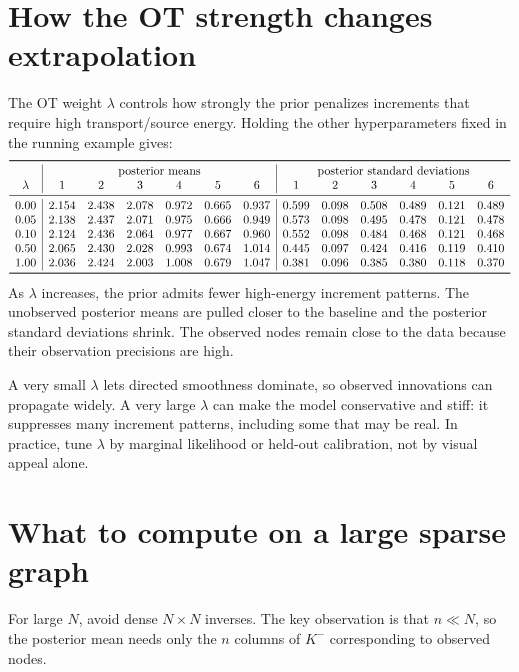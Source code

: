 \documentclass[11pt]{article}
\numberwithin{equation}{section}
\begin{document}
\section{How the OT strength changes extrapolation}
\label{sec:lambda-effects}

The OT weight $\lambda$ controls how strongly the prior penalizes increments that require high transport/source energy.  Holding the other hyperparameters fixed in the running example gives:
\[
\begin{array}{c|cccccc|cccccc}
\toprule
&\multicolumn{6}{c|}{\text{posterior means}}&\multicolumn{6}{c}{\text{posterior standard deviations}}\\
\lambda&1&2&3&4&5&6&1&2&3&4&5&6\\
\midrule
0.00&2.154&2.438&2.078&0.972&0.665&0.937&0.599&0.098&0.508&0.489&0.121&0.489\\
0.05&2.138&2.437&2.071&0.975&0.666&0.949&0.573&0.098&0.495&0.478&0.121&0.478\\
0.10&2.124&2.436&2.064&0.977&0.667&0.960&0.552&0.098&0.484&0.468&0.121&0.468\\
0.50&2.065&2.430&2.028&0.993&0.674&1.014&0.445&0.097&0.424&0.416&0.119&0.410\\
1.00&2.036&2.424&2.003&1.008&0.679&1.047&0.381&0.096&0.385&0.380&0.118&0.370\\
\bottomrule
\end{array}
\]
As $\lambda$ increases, the prior admits fewer high-energy increment patterns.  The unobserved posterior means are pulled closer to the baseline and the posterior standard deviations shrink.  The observed nodes remain close to the data because their observation precisions are high.

\begin{heuristicbox}
A very small $\lambda$ lets directed smoothness dominate, so observed innovations can propagate widely.  A very large $\lambda$ can make the model conservative and stiff: it suppresses many increment patterns, including some that may be real.  In practice, tune $\lambda$ by marginal likelihood or held-out calibration, not by visual appeal alone.
\end{heuristicbox}

\section{What to compute on a large sparse graph}
\label{sec:large-sparse-computation}

For large $N$, avoid dense $N\times N$ inverses.  The key observation is that $n\ll N$, so the posterior mean needs only the $n$ columns of $K^-$ corresponding to observed nodes.
\end{document}

